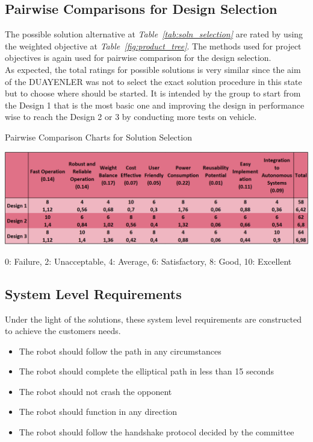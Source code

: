 \documentclass[a4paper,12pt]{article}
\begin{document}
\subsection{Pairwise Comparisons for Design Selection}		
	
	The possible solution alternative at \textit{Table~\ref{tab:soln_selection}} are rated by using the weighted objective at \textit{Table~\ref{fig:product_tree}}. The methods used for project objectives is again used for pairwise comparison for the design selection.\\
	
	
	As expected, the total ratings for possible solutions is very similar since the aim of the DUAYENLER was not to select the exact solution procedure in this state but to choose where should be started. It is intended by the group to start from the Design 1 that is the most basic one and improving the design in performance wise to reach the Design 2 or 3 by conducting more tests on vehicle.	
		
	\begin{table}[H]
		\centering
		\caption{\label{tab:soln_selection}Pairwise Comparison Charts for Solution Selection}\vspace{-.2cm}
		\includegraphics[width=\textwidth,center]{images/soln_selection3} 
	\vspace*{-.9cm}	\begin{center}
		{\small 0: Failure, 2: Unacceptable, 4: Average, 6: Satisfactory, 8: Good, 10: Excellent }	
		\end{center}
	\end{table}	\vspace*{-.5cm}	
	
	
\subsection{System Level Requirements}
	Under the light of the solutions, these system level requirements are constructed to achieve the customers needs.  
	\begin{itemize}
		\item The robot should follow the path in any circumstances
		\item The robot should complete the elliptical path in less than 15 seconds
		\item The robot should not crash the opponent
		\item The robot should function in any direction
		\item The robot should follow the handshake protocol decided by the committee
	\end{itemize}
	
\end{document}
